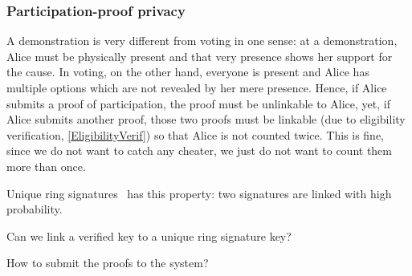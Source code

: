 \subsubsection{Participation-proof privacy}

A demonstration is very different from voting in one sense: at a demonstration, 
Alice must be physically present and that very presence shows her support for 
the cause.
In voting, on the other hand, everyone is present and Alice has multiple 
options which are not revealed by her mere presence.
Hence, if Alice submits a proof of participation, the proof must be unlinkable 
to Alice, yet, if Alice submits another proof, those two proofs must be 
linkable (due to eligibility verification, \cref{EligibilityVerif}) so that 
Alice is not counted twice.
This is fine, since we do not want to catch any cheater, we just do not want to
count them more than once.


\begin{frame}
  \begin{remark}
    Unique ring signatures~\cite{UniqueRingSignatures} has this property: two 
    signatures are linked with high probability.
  \end{remark}

  \begin{question}
    Can we link a verified key to a unique ring signature key?
  \end{question}

  \pause{}

  \begin{question}
    How to submit the proofs to the system?
  \end{question}
\end{frame}

